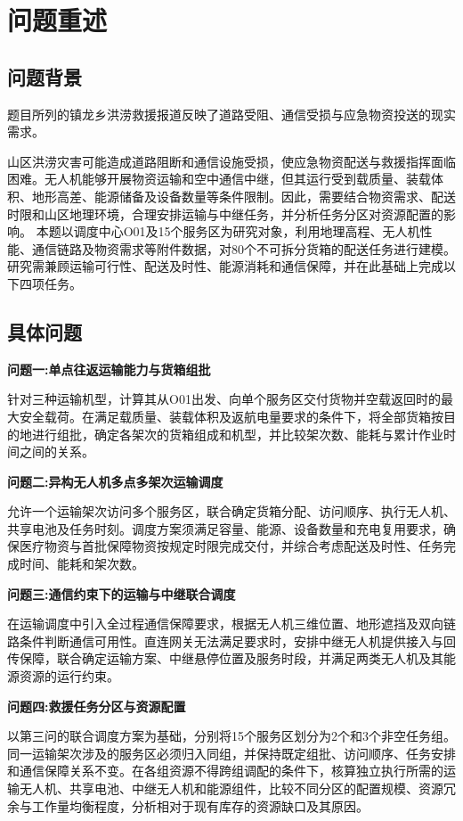 \documentclass[bwprint]{gmcmthesis}
\begin{document}
\pagestyle{plain}

\maketoc

\clearpage

\section{问题重述}
\subsection{问题背景}
题目所列的镇龙乡洪涝救援报道反映了道路受阻、通信受损与应急物资投送的现实需求\cite{xinhua2026,daily2026}。

山区洪涝灾害可能造成道路阻断和通信设施受损，使应急物资配送与救援指挥面临困难。无人机能够开展物资运输和空中通信中继，但其运行受到载质量、装载体积、地形高差、能源储备及设备数量等条件限制。因此，需要结合物资需求、配送时限和山区地理环境，合理安排运输与中继任务，并分析任务分区对资源配置的影响。
本题以调度中心O01及15个服务区为研究对象，利用地理高程、无人机性能、通信链路及物资需求等附件数据，对80个不可拆分货箱的配送任务进行建模。研究需兼顾运输可行性、配送及时性、能源消耗和通信保障，并在此基础上完成以下四项任务。
\subsection{具体问题}
\textbf{问题一:单点往返运输能力与货箱组批}

针对三种运输机型，计算其从O01出发、向单个服务区交付货物并空载返回时的最大安全载荷。在满足载质量、装载体积及返航电量要求的条件下，将全部货箱按目的地进行组批，确定各架次的货箱组成和机型，并比较架次数、能耗与累计作业时间之间的关系。

\textbf{问题二:异构无人机多点多架次运输调度}

允许一个运输架次访问多个服务区，联合确定货箱分配、访问顺序、执行无人机、共享电池及任务时刻。调度方案须满足容量、能源、设备数量和充电复用要求，确保医疗物资与首批保障物资按规定时限完成交付，并综合考虑配送及时性、任务完成时间、能耗和架次数。

\textbf{问题三:通信约束下的运输与中继联合调度}

在运输调度中引入全过程通信保障要求，根据无人机三维位置、地形遮挡及双向链路条件判断通信可用性。直连网关无法满足要求时，安排中继无人机提供接入与回传保障，联合确定运输方案、中继悬停位置及服务时段，并满足两类无人机及其能源资源的运行约束。

\textbf{问题四:救援任务分区与资源配置}

以第三问的联合调度方案为基础，分别将15个服务区划分为2个和3个非空任务组。同一运输架次涉及的服务区必须归入同组，并保持既定组批、访问顺序、任务安排和通信保障关系不变。在各组资源不得跨组调配的条件下，核算独立执行所需的运输无人机、共享电池、中继无人机和能源组件，比较不同分区的配置规模、资源冗余与工作量均衡程度，分析相对于现有库存的资源缺口及其原因。
\clearpage
\end{document}
